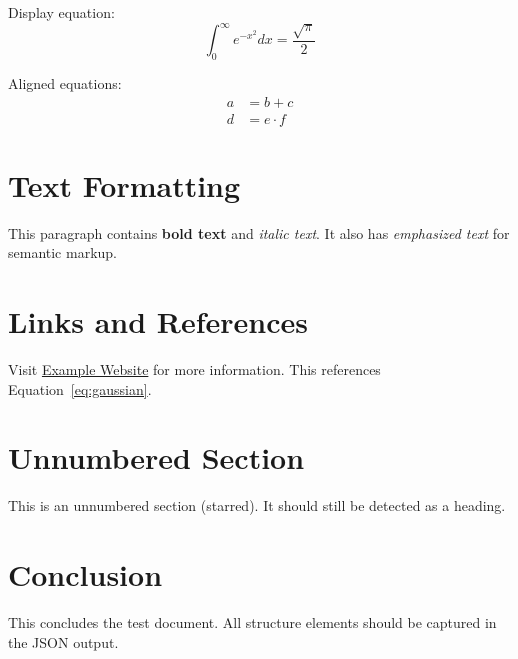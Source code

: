 \documentclass{article}
\begin{document}
Display equation:
\begin{equation}
\int_0^\infty e^{-x^2} dx = \frac{\sqrt{\pi}}{2}
\label{eq:gaussian}
\end{equation}

Aligned equations:
\begin{align}
a &= b + c \\
d &= e \cdot f
\end{align}

\section{Text Formatting}

This paragraph contains \textbf{bold text} and \textit{italic text}.
It also has \emph{emphasized text} for semantic markup.

\section{Links and References}

Visit \href{https://example.com}{Example Website} for more information.
This references Equation~\ref{eq:gaussian}.

\section*{Unnumbered Section}

This is an unnumbered section (starred).
It should still be detected as a heading.

\section{Conclusion}

This concludes the test document.
All structure elements should be captured in the JSON output.
\end{document}
